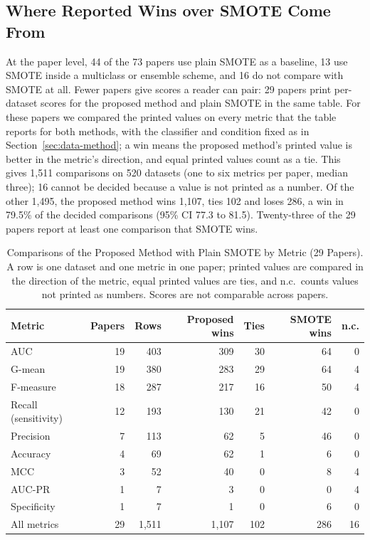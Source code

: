 \subsection{Where Reported Wins over SMOTE Come From}
\label{sec:data-wins}
At the paper level, 44 of the 73 papers use plain SMOTE as a baseline,
13 use SMOTE inside a multiclass or ensemble scheme, and 16 do not compare with
SMOTE at all. Fewer papers give scores a reader can pair: 29 papers print
per-dataset scores for the proposed method and plain SMOTE in the same table.
For these papers we compared the printed values on every metric that the table
reports for both methods, with the classifier and condition fixed as in
Section~\ref{sec:data-method}; a win means the proposed method's printed value is
better in the metric's direction, and equal printed values count as a tie. This
gives 1,511 comparisons on 520 datasets (one to six metrics per paper, median
three); 16 cannot be decided because a value is not printed as a number. Of the
other 1,495, the proposed method wins 1,107, ties 102 and loses 286, a win in
79.5\% of the decided comparisons (95\% CI 77.3 to 81.5). Twenty-three of the 29
papers report at least one comparison that SMOTE wins.

\begin{table}[t]
\centering\small
\caption{Comparisons of the Proposed Method with Plain SMOTE by Metric (29 Papers).
A row is one dataset and one metric in one paper; printed values are compared in the
direction of the metric, equal printed values are ties, and n.c.\ counts values not
printed as numbers. Scores are not comparable across papers.}
\label{tab:wins-by-metric}
\begin{tabular}{lrrrrrr}
\toprule
Metric & Papers & Rows & Proposed wins & Ties & SMOTE wins & n.c.\\
\midrule
AUC & 19 & 403 & 309 & 30 & 64 & 0\\
G-mean & 19 & 380 & 283 & 29 & 64 & 4\\
F-measure & 18 & 287 & 217 & 16 & 50 & 4\\
Recall (sensitivity) & 12 & 193 & 130 & 21 & 42 & 0\\
Precision & 7 & 113 & 62 & 5 & 46 & 0\\
Accuracy & 4 & 69 & 62 & 1 & 6 & 0\\
MCC & 3 & 52 & 40 & 0 & 8 & 4\\
AUC-PR & 1 & 7 & 3 & 0 & 0 & 4\\
Specificity & 1 & 7 & 1 & 0 & 6 & 0\\
\addlinespace
All metrics & 29 & 1,511 & 1,107 & 102 & 286 & 16\\
\bottomrule
\end{tabular}
\end{table}

